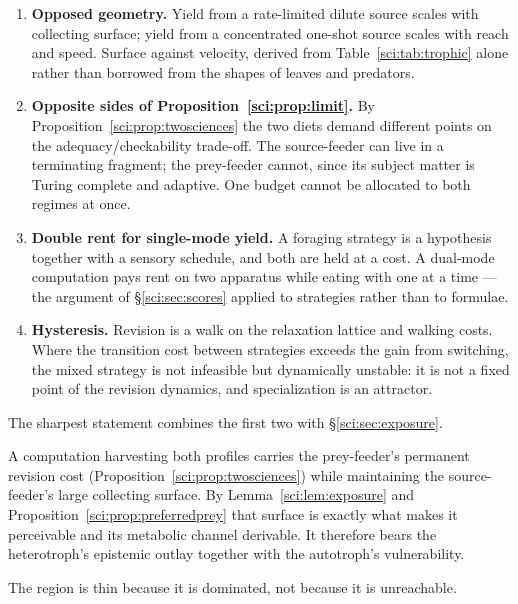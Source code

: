 \begin{enumerate}
\item \textbf{Opposed geometry.} Yield from a rate-limited dilute source scales with collecting
surface; yield from a concentrated one-shot source scales with reach and speed. Surface against
velocity, derived from Table~\ref{sci:tab:trophic} alone rather than borrowed from the shapes of leaves
and predators.

\item \textbf{Opposite sides of Proposition~\ref{sci:prop:limit}.} By Proposition~\ref{sci:prop:twosciences}
the two diets demand different points on the adequacy/checkability trade-off. The source-feeder can
live in a terminating fragment; the prey-feeder cannot, since its subject matter is Turing complete
and adaptive. One budget cannot be allocated to both regimes at once.

\item \textbf{Double rent for single-mode yield.} A foraging strategy is a hypothesis together with a
sensory schedule, and both are held at a cost. A dual-mode computation pays rent on two apparatus
while eating with one at a time --- the argument of \S\ref{sci:sec:scores} applied to strategies rather
than to formulae.

\item \textbf{Hysteresis.} Revision is a walk on the relaxation lattice and walking costs. Where the
transition cost between strategies exceeds the gain from switching, the mixed strategy is not
infeasible but dynamically unstable: it is not a fixed point of the revision dynamics, and
specialization is an attractor.
\end{enumerate}

The sharpest statement combines the first two with \S\ref{sci:sec:exposure}.

\begin{proposition}
\label{sci:prop:worstofboth}
A computation harvesting both profiles carries the prey-feeder's permanent revision cost
(Proposition~\ref{sci:prop:twosciences}) while maintaining the source-feeder's large collecting surface.
By Lemma~\ref{sci:lem:exposure} and Proposition~\ref{sci:prop:preferredprey} that surface is exactly what makes
it perceivable and its metabolic channel derivable. It therefore bears the heterotroph's epistemic
outlay together with the autotroph's vulnerability.
\end{proposition}

The region is thin because it is dominated, not because it is unreachable.

